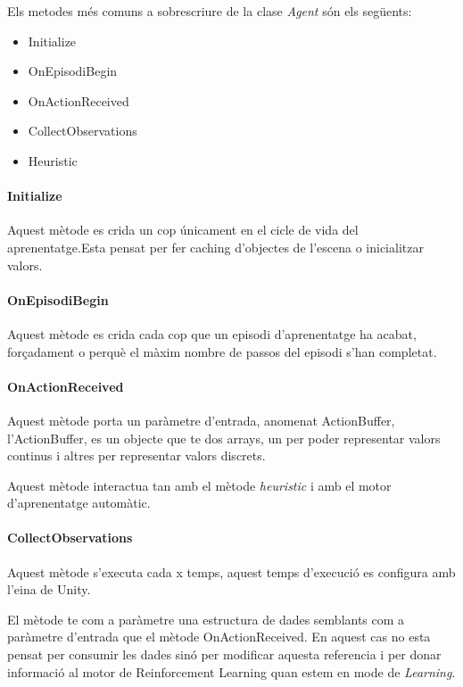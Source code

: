 \documentclass{article}
\begin{document}
    Els metodes més comuns a sobrescriure de la clase \textit{Agent} són els següents:
    \begin{itemize}
        \item Initialize
        \item OnEpisodiBegin
        \item OnActionReceived
        \item CollectObservations
        \item Heuristic
    \end{itemize}
    
    \newpage
    
    \paragraph{Initialize}
    Aquest mètode es crida un cop únicament en el cicle de vida del aprenentatge.Esta pensat per fer caching d’objectes de l'escena o inicialitzar valors.
    
    \paragraph{OnEpisodiBegin}
    Aquest mètode es crida cada cop que un episodi d’aprenentatge ha acabat, forçadament o perquè el màxim nombre de passos del episodi s’han completat.
    
    \paragraph{OnActionReceived}
    Aquest mètode porta un paràmetre d’entrada, anomenat ActionBuffer, l’ActionBuffer, es un objecte que te dos arrays, un per poder representar valors continus i altres per representar valors discrets.
    
    Aquest mètode interactua tan amb el mètode \textit{heuristic} i amb el motor d'aprenentatge automàtic.
    
    \paragraph{CollectObservations}
    Aquest mètode s’executa cada x temps, aquest temps d’execució es configura amb l’eina de Unity.
    
    El mètode te com a paràmetre una  estructura de dades semblants com a paràmetre d'entrada que el mètode OnActionReceived. En aquest cas no esta pensat per consumir les dades sinó per modificar aquesta referencia i per donar informació al motor de Reinforcement Learning quan estem en mode de \textit{Learning}.
\end{document}
